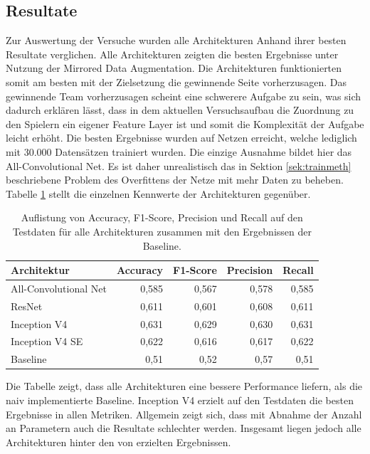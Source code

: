 \subsection{Resultate}
\label{Resultate}

Zur Auswertung der Versuche wurden alle Architekturen Anhand ihrer besten Resultate verglichen. Alle Architekturen zeigten die besten Ergebnisse unter Nutzung der Mirrored Data Augmentation. Die Architekturen funktionierten somit am besten mit der Zielsetzung die gewinnende Seite vorherzusagen. Das gewinnende Team vorherzusagen scheint eine schwerere Aufgabe zu sein, was sich dadurch erklären lässt, dass in dem aktuellen Versuchsaufbau die Zuordnung zu den Spielern ein eigener Feature Layer ist und somit die Komplexität der Aufgabe leicht erhöht. Die besten Ergebnisse wurden auf Netzen erreicht, welche lediglich mit 30.000 Datensätzen trainiert wurden. Die einzige Ausnahme bildet hier das All-Convolutional Net. Es ist daher unrealistisch das in Sektion \ref{sek:trainmeth} beschriebene Problem des Overfittens der Netze mit mehr Daten zu beheben. Tabelle \ref{tb:comp} stellt die einzelnen Kennwerte der Architekturen gegenüber.

\begin{table}[H]
\centering
\caption{Auflistung von Accuracy, F1-Score, Precision und Recall auf den Testdaten für alle Architekturen zusammen mit den Ergebnissen der Baseline.}
\begin{tabular}{@{}lrrrr@{}}
\hline
Architektur & Accuracy & F1-Score & Precision & Recall\\
\hline
All-Convolutional Net & 0,585 & 0,567 & 0,578 & 0,585\\
ResNet & 0,611 & 0,601 & 0,608 & 0,611\\
Inception V4 & 0,631 & 0,629 & 0,630 & 0,631 \\
Inception V4 SE & 0,622 & 0,616 & 0,617 & 0,622\\
Baseline & 0,51 & 0,52 & 0,57 & 0,51 \\
\hline
\end{tabular}
\label{tb:comp}
\end{table}

Die Tabelle zeigt, dass alle Architekturen eine bessere Performance liefern, als die naiv implementierte Baseline. Inception V4 erzielt auf den Testdaten die besten Ergebnisse in allen Metriken. Allgemein zeigt sich, dass mit Abnahme der Anzahl an Parametern auch die Resultate schlechter werden. Insgesamt liegen jedoch alle Architekturen hinter den von \textcite{SnchezRuizGranados2015PredictingTO, AIIDE137381, AIIDE1511531} erzielten Ergebnissen. 

